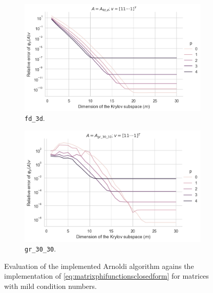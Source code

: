 \begin{figure}[h!]
    \centering
    \begin{subfigure}[b]{0.45\textwidth}
        \includegraphics[width=\textwidth]{img/krylovunivariate/fd_3d_recursive.png}
        \caption{\texttt{fd\_3d}.}
    \end{subfigure}
    \hfill
    \begin{subfigure}[b]{0.45\textwidth}
        \includegraphics[width=\textwidth]{img/krylovunivariate/gr_30_30_recursive.png}
        \caption{\texttt{gr\_30\_30}.}
    \end{subfigure}
    \caption{Evaluation of the implemented Arnoldi algorithm agains the implementation of \autoref{eq:matrixphifunctionsclosedform}
    for matrices with mild condition numbers.}
    \label{fig:krylovmethodunivariateevaluationrecursive}
\end{figure}

